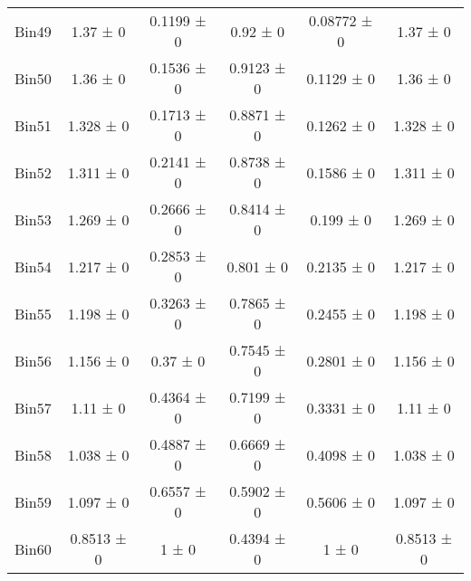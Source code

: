 \begin{tabular}{@{\extracolsep{4pt}}lccccc@{}}
     Bin49 & 1.37 ± 0 & 0.1199 ± 0 & 0.92 ± 0 & 0.08772 ± 0 & 1.37 ± 0 \\ 
     Bin50 & 1.36 ± 0 & 0.1536 ± 0 & 0.9123 ± 0 & 0.1129 ± 0 & 1.36 ± 0 \\ 
     Bin51 & 1.328 ± 0 & 0.1713 ± 0 & 0.8871 ± 0 & 0.1262 ± 0 & 1.328 ± 0 \\ 
     Bin52 & 1.311 ± 0 & 0.2141 ± 0 & 0.8738 ± 0 & 0.1586 ± 0 & 1.311 ± 0 \\ 
     Bin53 & 1.269 ± 0 & 0.2666 ± 0 & 0.8414 ± 0 & 0.199 ± 0 & 1.269 ± 0 \\ 
     Bin54 & 1.217 ± 0 & 0.2853 ± 0 & 0.801 ± 0 & 0.2135 ± 0 & 1.217 ± 0 \\ 
     Bin55 & 1.198 ± 0 & 0.3263 ± 0 & 0.7865 ± 0 & 0.2455 ± 0 & 1.198 ± 0 \\ 
     Bin56 & 1.156 ± 0 & 0.37 ± 0 & 0.7545 ± 0 & 0.2801 ± 0 & 1.156 ± 0 \\ 
     Bin57 & 1.11 ± 0 & 0.4364 ± 0 & 0.7199 ± 0 & 0.3331 ± 0 & 1.11 ± 0 \\ 
     Bin58 & 1.038 ± 0 & 0.4887 ± 0 & 0.6669 ± 0 & 0.4098 ± 0 & 1.038 ± 0 \\ 
     Bin59 & 1.097 ± 0 & 0.6557 ± 0 & 0.5902 ± 0 & 0.5606 ± 0 & 1.097 ± 0 \\ 
     Bin60 & 0.8513 ± 0 & 1 ± 0 & 0.4394 ± 0 & 1 ± 0 & 0.8513 ± 0 \\ 
\hline\hline
  \end{tabular}

